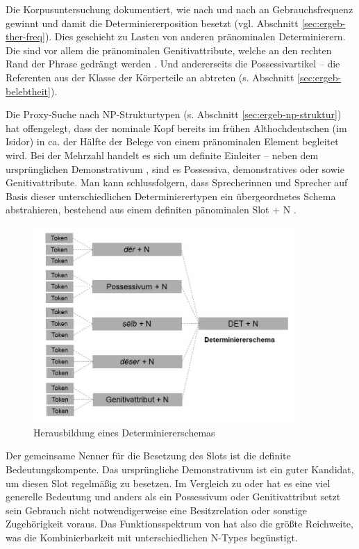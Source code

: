 Die Korpusuntersuchung dokumentiert, wie  nach und nach an Gebrauchsfrequenz gewinnt und damit die Determiniererposition besetzt (vgl. Abschnitt \ref{sec:ergeb-ther-freq}). Dies geschieht zu Lasten von anderen pränominalen Determinierern. Die  sind vor allem die pränominalen Genitivattribute, welche an den rechten Rand der Phrase gedrängt werden \parencite[zur weiterführenden Diskussion s.][]{Demske2001}. Und andererseits die Possessivartikel -- die  Referenten aus der Klasse der Körperteile an  abtreten (s. Abschnitt \ref{sec:ergeb-belebtheit}). 

Die Proxy-Suche nach NP-Strukturtypen (s. Abschnitt \ref{sec:ergeb-np-struktur}) hat offengelegt, dass der nominale Kopf bereits im frühen Althochdeutschen (im Isidor) in ca. der Hälfte der Belege von einem pränominalen Element begleitet wird. Bei der Mehrzahl handelt es sich um definite Einleiter -- neben dem ursprünglichen Demonstrativum , sind es Possessiva, demonstratives  oder  sowie Genitivattribute. Man kann schlussfolgern, dass Sprecherinnen und Sprecher auf Basis dieser unterschiedlichen Determinierertypen ein übergeordnetes Schema abstrahieren, bestehend aus einem definiten pänominalen Slot + N \parencite[ähnlich fürs Altenglische][]{Sommerer2011}. 
  
\begin{figure}
\begin{center}
  \includegraphics[width=10cm]{images/schematisierung-det-slot-sw.jpg}
\caption {Herausbildung eines Determiniererschemas} 
\label{abb:schematisierung}
\end{center}
\end{figure} 
 
Der gemeinsame Nenner für die Besetzung des Slots ist die definite Bedeutungskompente. Das ursprüngliche Demonstrativum ist ein guter Kandidat, um diesen Slot regelmäßig zu besetzen. Im Vergleich zu  oder  hat es eine viel generelle Bedeutung und anders als ein Possessivum oder Genitivattribut setzt sein Gebrauch nicht notwendigerweise eine Besitzrelation oder sonstige Zugehörigkeit voraus. Das Funktionsspektrum von  hat also die größte Reichweite, was die  Kombinierbarkeit mit unterschiedlichen N-Types begünstigt.

